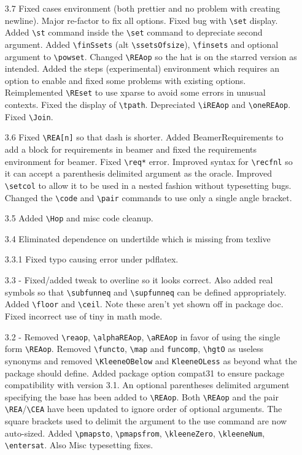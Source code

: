 \documentclass[leqno,11pt]{amsart}
\begin{document}
\begin{itemize}
	\item[3.7] Fixed cases environment (both prettier and no problem with creating newline).  Major re-factor to fix all options.  Fixed bug with \verb=\set= display.  Added \verb=\st= command inside the \verb=\set= command to depreciate second argument.  Added \verb=\finSsets= (alt \verb=\ssetsOfsize=), \verb=\finsets= and optional argument to \verb=\powset=.  Changed \verb=\REAop= so the hat is on the starred version as intended.  Added the steps (experimental) environment which requires an option to enable and fixed some problems with existing options.  Reimplemented \verb=\REset= to use xparse to avoid some errors in unusual contexts.  Fixed the display of \verb=\tpath=.   Depreciated \verb=\iREAop= and \verb=\oneREAop=.  Fixed \verb=\Join=.
	\item[3.6] Fixed \verb=\REA[n]= so that dash is shorter.  Added BeamerRequirements to add a block for requirements in beamer and fixed the requirements environment for beamer.  Fixed \verb=\req*= error.  Improved syntax for \verb=\recfnl= so it can accept a parenthesis delimited argument as the oracle.  Improved \verb=\setcol= to allow it to be used in a nested fashion without typesetting bugs.  Changed the \verb=\code= and \verb=\pair= commands to use only a single angle bracket.
	\item[3.5] Added \verb=\Hop= and misc code cleanup.
	\item[3.4] Eliminated dependence on undertilde which is missing from texlive
	\item[3.3.1] Fixed typo causing error under pdflatex.
	\item[3.3]  - Fixed/added tweak to overline so it looks correct.  Also added real symbols so that \verb=\subfunneq= and \verb=\supfunneq= can be defined appropriately.  Added \verb=\floor= and \verb=\ceil=.  Note these aren't yet shown off in package doc.  Fixed incorrect use of tiny in math mode.
	\item[3.2]	- Removed \verb=\reaop=, \verb=\alphaREAop=, \verb=\aREAop= in favor of using the single form \verb=\REAop=.  Removed \verb=\functo=, \verb=\map= and \verb=funcomp=, \verb=\hgtO= as useless synonyms and removed \verb=\KleeneOBelow= and \verb=KleeneOLess= as beyond what the package should define. Added package option compat31 to ensure package compatibility with version 3.1.  An optional parentheses delimited argument specifying the base has been added to  \verb=\REAop=.  Both \verb=\REAop= and the pair \verb=\REA=/\verb=\CEA= have been updated to ignore order of optional arguments.  The square brackets used to delimit the argument to the use command are now auto-sized.  Added \verb=\pmapsto=, \verb=\pmapsfrom=, \verb=\kleeneZero=, \verb=\kleeneNum=, \verb=\entersat=.  Also Misc typesetting fixes.  

\end{itemize}
\end{document}

